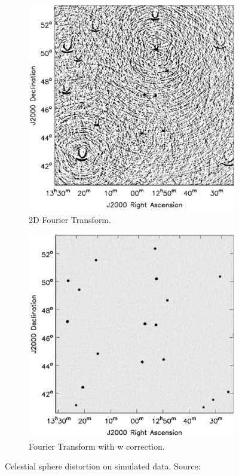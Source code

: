 \begin{figure}[h]
	\centering
	\begin{subfigure}[b]{0.45\linewidth}
		\includegraphics[width=\linewidth]{./chapters/03.challenges/w-no-correction.png}
		\caption{2D Fourier Transform.}
		\label{meerkat:2dfft}
	\end{subfigure}
	\begin{subfigure}[b]{0.45\linewidth}
		\includegraphics[width=\linewidth]{./chapters/03.challenges/w-correction.png}
		\caption{Fourier Transform with w correction.}
		\label{meerkat:wcorrection}
	\end{subfigure}
	\caption{Celestial sphere distortion on simulated data. Source: \cite{cornwell2008noncoplanar}}
	\label{meerkat:wdistortion}
\end{figure}

